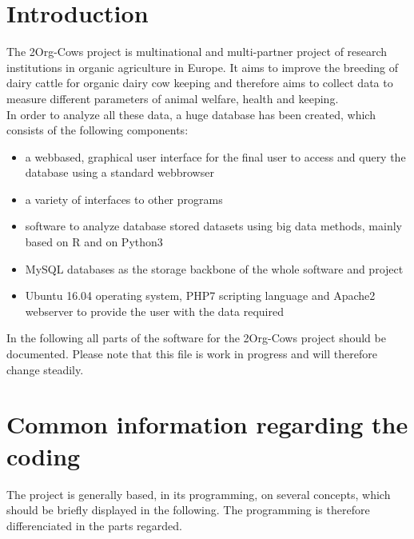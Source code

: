 
\section{Introduction}

The 2Org-Cows project is multinational and multi-partner project of research institutions in organic agriculture in Europe. It aims to improve the breeding of dairy cattle for 
organic dairy cow keeping and therefore aims to collect data to measure different parameters of animal welfare, health and keeping.\\
In order to analyze all these data, a huge database has been created, which consists of the following components:
\begin{itemize}
 \item a webbased, graphical user interface for the final user to access and query the database using a standard webbrowser
 \item a variety of interfaces to other programs
 \item software to analyze database stored datasets using big data methods, mainly based on R and on Python3
 \item MySQL databases as the storage backbone of the whole software and project
 \item Ubuntu 16.04 operating system, PHP7 scripting language and Apache2 webserver to provide the user with the data required
\end{itemize}
In the following all parts of the software for the 2Org-Cows project should be documented. Please note that this file is work in progress and will therefore change steadily.

\section{Common information regarding the coding}
The project is generally based, in its programming, on several concepts, which should be briefly displayed in the following. The programming is therefore differenciated in the 
parts regarded. 

